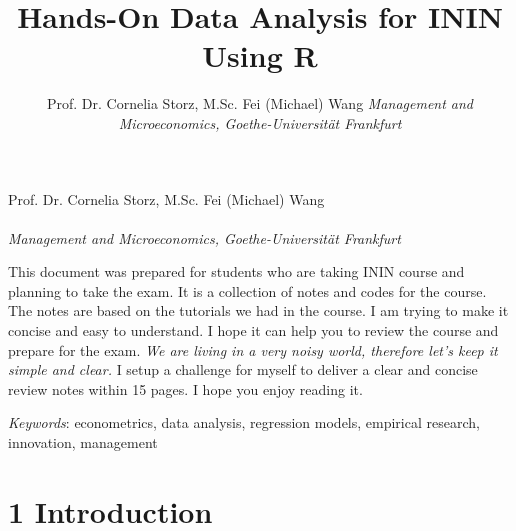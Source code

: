 \documentclass[11pt]{article}
\title{Hands-On Data Analysis for ININ Using R}
\author{\Large Prof. Dr. Cornelia Storz, M.Sc. Fei (Michael) Wang\vspace{0.05in} \newline\normalsize\emph{Management and Microeconomics, Goethe-Universität Frankfurt}  }
\date{}
\newcommand*{\authorfont}{\fontfamily{phv}\selectfont}
\theoremstyle{definition}
\renewenvironment{abstract}
 {{%
    \setlength{\leftmargin}{0mm}
    \setlength{\rightmargin}{\leftmargin}%
  }%
  \relax}
 {\endlist}
\begin{document}
	
%

{%
\setlength{\parindent}{0pt}
\thispagestyle{plain}
{\fontsize{18}{20}\selectfont\raggedright 
\maketitle  %

}

{
   \vskip 13.5pt\relax \normalsize\fontsize{11}{12} 
   \authorfont Prof. Dr. Cornelia Storz, M.Sc. Fei (Michael) Wang \\
   \\ 
    \emph{\small Management and Microeconomics, Goethe-Universität Frankfurt}   
}

}



\begin{abstract}
    \hbox{\vrule height .2pt width 39.14pc}
    \vskip 8.5pt %

\noindent This document was prepared for students who are taking ININ course and
planning to take the exam. It is a collection of notes and codes for the
course. The notes are based on the tutorials we had in the course. I am trying
to make it concise and easy to understand. I hope it can help you to review
the course and prepare for the exam. \textit{We are living in a very noisy world,
therefore let's keep it simple and clear.} I setup a challenge for myself to
deliver a clear and concise review notes within 15 pages. I hope you enjoy
reading it. \par

 

\vskip 8.5pt \noindent \emph{Keywords}: econometrics, data analysis, regression models, 
empirical research, innovation, management  \par
\hbox{\vrule height .2pt width 39.14pc}

\end{abstract}

\vskip -8.5pt


\noindent  

\hypersetup{linkcolor=black}
\setcounter{tocdepth}{3}
\tableofcontents


\newpage
{}
\setcounter{page}{1}
\section{1 Introduction}
\end{document}
